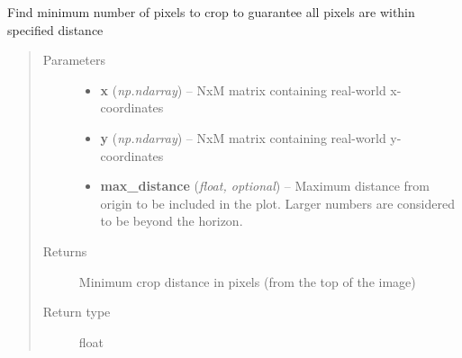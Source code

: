 \documentclass[letterpaper,10pt,english]{sphinxmanual}
\begin{document}
\begin{fulllineitems}
\label{flamingo/rectification/index:flamingo.rectification.plot.find_horizon_offset}
Find minimum number of pixels to crop to guarantee all pixels are within specified distance
\begin{quote}\begin{description}
\item[{Parameters}] \leavevmode\begin{itemize}
\item {} 
\textbf{x} (\emph{np.ndarray}) -- NxM matrix containing real-world x-coordinates

\item {} 
\textbf{y} (\emph{np.ndarray}) -- NxM matrix containing real-world y-coordinates

\item {} 
\textbf{max\_distance} (\emph{float, optional}) -- Maximum distance from origin to be included in the plot.
Larger numbers are considered to be beyond the horizon.

\end{itemize}

\item[{Returns}] \leavevmode
Minimum crop distance in pixels (from the top of the image)

\item[{Return type}] \leavevmode
float

\end{description}\end{quote}

\end{fulllineitems}

\end{document}
